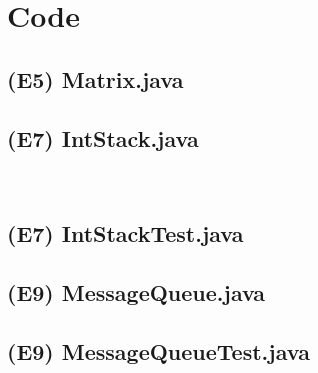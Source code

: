 \documentclass[main.tex]{subfiles}
\begin{document}
\section*{Code}

\subsection*{(E5) Matrix.java}


\newpage
\subsection*{(E7) IntStack.java}

\\  
\subsection*{(E7) IntStackTest.java}


\newpage
\subsection*{(E9) MessageQueue.java}


\newpage
\subsection*{(E9) MessageQueueTest.java}

\end{document}
